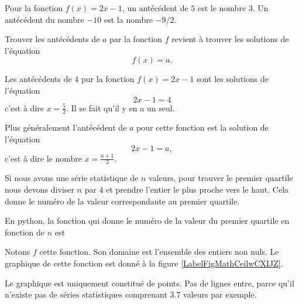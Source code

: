 \begin{example}
    Pour la fonction \( f(x)=2x-1\), un antécédent de \( 5\) est le nombre \( 3\). Un antécédent du nombre \( -10\) est la nombre \( -9/2\).
\end{example}

\begin{Aretenir}
    Trouver les antécédents de \( a\) par la fonction \( f\) revient à trouver les solutions de l'équation
    \begin{equation}
        f(x)=a.
    \end{equation}
\end{Aretenir}


\begin{example}

    Les antécédents de \( 4\) pur la fonction \( f(x)=2x-1\) sont les solutions de l'équation
    \begin{equation}
        2x-1=4
    \end{equation}
    c'est à dire \( x=\frac{ 5 }{2}\). Il se fait qu'il y en a un seul.

    Plus généralement l'antécédent de \( a\) pour cette fonction est la solution de l'équation
    \begin{equation}
        2x-1=a,
    \end{equation}
    c'est à dire le nombre \( x=\frac{ a+1 }{ 2 }\).
\end{example}

\begin{example} \label{EqlaIGDz}
    Si nous avons une série statistique de \( n\) valeurs, pour trouver le premier quartile nous devons diviser \( n\) par \( 4\) et prendre l'entier le plus proche vers le haut. Cela donne le numéro de la valeur correspondante au premier quartile.

    En python, la fonction qui donne le numéro de la valeur du premier quartile en fonction de \( n\) est
    \begin{quote}
    \end{quote}
    Notons \( f\) cette fonction. Son domaine est l'ensemble des entiers non nuls. Le graphique de cette fonction est donné à la figure \ref{LabelFigMathCeilwCXIJZ}.
\newcommand{\CaptionFigMathCeilwCXIJZ}{Le numéro de la valeur du premier quartile en fonction du nombre de valeurs.}


    Le graphique est uniquement constitué de points. Pas de lignes entre, parce qu'il n'existe pas de séries statistiques comprenant \( 3.7\) valeurs par exemple. 
\end{example}

